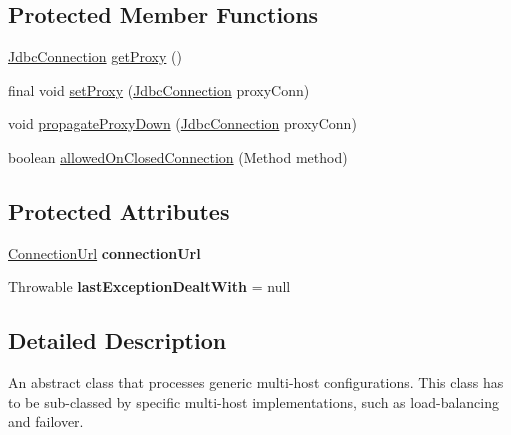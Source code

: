 \subsection*{Protected Member Functions}
\begin{DoxyCompactItemize}
\item 
\mbox{\hyperlink{interfacecom_1_1mysql_1_1cj_1_1jdbc_1_1_jdbc_connection}{Jdbc\+Connection}} \mbox{\hyperlink{classcom_1_1mysql_1_1cj_1_1jdbc_1_1ha_1_1_multi_host_connection_proxy_a89beece2de4d34030d58a90a40ac5c9f}{get\+Proxy}} ()
\item 
final void \mbox{\hyperlink{classcom_1_1mysql_1_1cj_1_1jdbc_1_1ha_1_1_multi_host_connection_proxy_a14df65af9560d49c9ee1f9c3ea2da376}{set\+Proxy}} (\mbox{\hyperlink{interfacecom_1_1mysql_1_1cj_1_1jdbc_1_1_jdbc_connection}{Jdbc\+Connection}} proxy\+Conn)
\item 
void \mbox{\hyperlink{classcom_1_1mysql_1_1cj_1_1jdbc_1_1ha_1_1_multi_host_connection_proxy_a290e636d680ff120338e9d781cbb33c1}{propagate\+Proxy\+Down}} (\mbox{\hyperlink{interfacecom_1_1mysql_1_1cj_1_1jdbc_1_1_jdbc_connection}{Jdbc\+Connection}} proxy\+Conn)
\item 
boolean \mbox{\hyperlink{classcom_1_1mysql_1_1cj_1_1jdbc_1_1ha_1_1_multi_host_connection_proxy_a0abd1b79ee2ab0d89e01c95f1dc53197}{allowed\+On\+Closed\+Connection}} (Method method)
\end{DoxyCompactItemize}
\subsection*{Protected Attributes}
\begin{DoxyCompactItemize}
\item 
\mbox{\label{classcom_1_1mysql_1_1cj_1_1jdbc_1_1ha_1_1_multi_host_connection_proxy_aae3d1ff31056ba5a6686ce6e692a64a8}} 
\mbox{\hyperlink{classcom_1_1mysql_1_1cj_1_1conf_1_1_connection_url}{Connection\+Url}} {\bfseries connection\+Url}
\item 
\mbox{\label{classcom_1_1mysql_1_1cj_1_1jdbc_1_1ha_1_1_multi_host_connection_proxy_a8d7e0a7a6f8dcdee3099f3e1c8c2f59a}} 
Throwable {\bfseries last\+Exception\+Dealt\+With} = null
\end{DoxyCompactItemize}


\subsection{Detailed Description}
An abstract class that processes generic multi-\/host configurations. This class has to be sub-\/classed by specific multi-\/host implementations, such as load-\/balancing and failover. 

